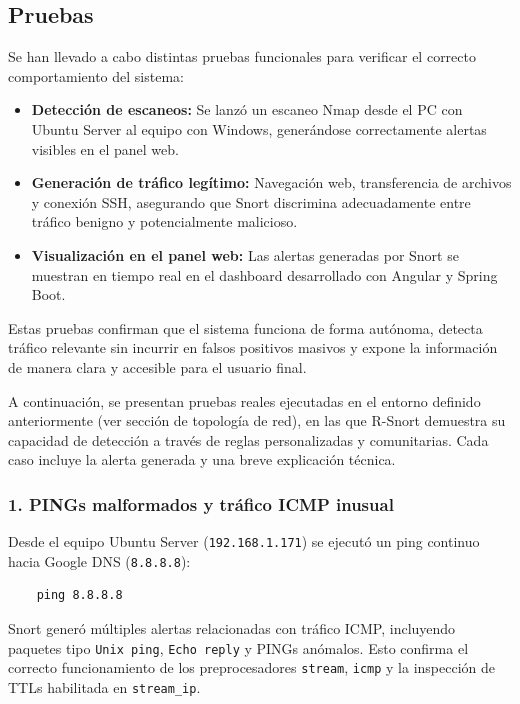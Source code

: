 \documentclass[11pt,a4paper,twoside]{report}
\begin{document}
\subsection{Pruebas}

Se han llevado a cabo distintas pruebas funcionales para verificar el correcto comportamiento del sistema:

\begin{itemize}
	\item \textbf{Detección de escaneos:} Se lanzó un escaneo Nmap desde el PC con Ubuntu Server al equipo con Windows, generándose correctamente alertas visibles en el panel web.
	\item \textbf{Generación de tráfico legítimo:} Navegación web, transferencia de archivos y conexión SSH, asegurando que Snort discrimina adecuadamente entre tráfico benigno y potencialmente malicioso.
	\item \textbf{Visualización en el panel web:} Las alertas generadas por Snort se muestran en tiempo real en el dashboard desarrollado con Angular y Spring Boot.
\end{itemize}

Estas pruebas confirman que el sistema funciona de forma autónoma, detecta tráfico relevante sin incurrir en falsos positivos masivos y expone la información de manera clara y accesible para el usuario final.\newline

A continuación, se presentan pruebas reales ejecutadas en el entorno definido anteriormente (ver sección de topología de red), en las que R-Snort demuestra su capacidad de detección a través de reglas personalizadas y comunitarias. Cada caso incluye la alerta generada y una breve explicación técnica.

\vspace{0.5cm}

\subsubsection*{1. PINGs malformados y tráfico ICMP inusual}

Desde el equipo Ubuntu Server (\texttt{192.168.1.171}) se ejecutó un ping continuo hacia Google DNS (\texttt{8.8.8.8}):

\begin{verbatim}
	ping 8.8.8.8
\end{verbatim}

Snort generó múltiples alertas relacionadas con tráfico ICMP, incluyendo paquetes tipo \texttt{Unix ping}, \texttt{Echo reply} y PINGs anómalos. Esto confirma el correcto funcionamiento de los preprocesadores \texttt{stream}, \texttt{icmp} y la inspección de TTLs habilitada en \texttt{stream\_ip}.\newline
\end{document}
